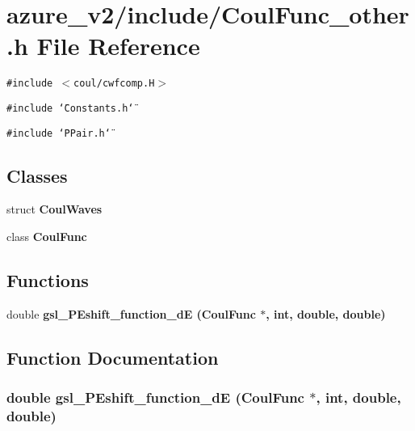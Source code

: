 \section{azure\_\-v2/include/Coul\-Func\_\-other.h File Reference}
\label{CoulFunc__other_8h}
{\tt \#include $<$coul/cwfcomp.H$>$}\par
{\tt \#include \char`\"{}Constants.h\char`\"{}}\par
{\tt \#include \char`\"{}PPair.h\char`\"{}}\par
\subsection*{Classes}
\begin{CompactItemize}
\item 
struct \bf{Coul\-Waves}
\item 
class \bf{Coul\-Func}
\end{CompactItemize}
\subsection*{Functions}
\begin{CompactItemize}
\item 
double \bf{gsl\_\-PEshift\_\-function\_\-d\-E} (\bf{Coul\-Func} $\ast$, int, double, double)
\end{CompactItemize}


\subsection{Function Documentation}
\subsubsection{\setlength{\rightskip}{0pt plus 5cm}double gsl\_\-PEshift\_\-function\_\-d\-E (\bf{Coul\-Func} $\ast$, int, double, double)}\label{CoulFunc__other_8h_1857cfc246c40cf3775d6bc5190e9621}


